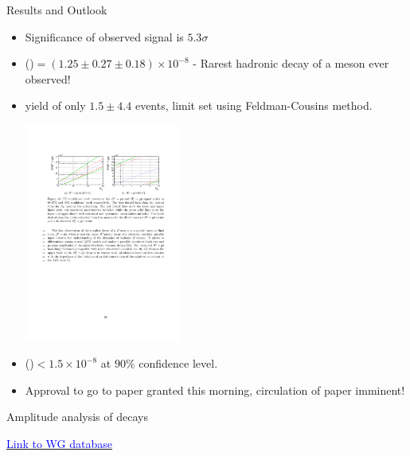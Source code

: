 \documentclass{beamer}
\begin{document}
\begin{frame}{Results and Outlook}
  \begin{itemize}
  \item Significance of observed \decay{\Bd}{\proton \antiproton} signal is $5.3\sigma$
  \item \BF(\decay{\Bd}{\proton \antiproton})$ = (1.25\pm0.27\pm0.18) \times 10^{-8}$ - Rarest hadronic decay of a \PB meson ever observed!
  \item \decay{\Bs}{\proton \antiproton} yield of only $1.5\pm4.4$ events, limit set using Feldman-Cousins method.
    \begin{center}
      \includegraphics[width=0.4\textwidth]{PPBarFC.pdf}
    \end{center}
  \item \BF(\decay{\Bs}{\proton \antiproton})$ < 1.5 \times 10^{-8} $ at $90\%$ confidence level.
  \item Approval to go to paper granted this morning, circulation of paper imminent!
  \end{itemize}
\end{frame}

\begin{frame}
  \begin{block}{}
    \centering Amplitude analysis of \Large \decay{\Bd}{(\pip \pim)(\Kp\pim)} decays
  \end{block}
  \centering \href{https://lhcb-wg.web.cern.ch/lhcb-WG/bnoc/listentry.py?name=2011\%2B12+B+-\%3E+K\%2A0+rho0+BF\&cat=analysis}{\textcolor{blue}{Link to WG database}}
\end{frame}
\end{document}
